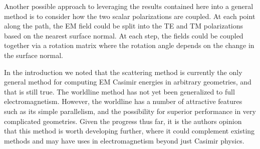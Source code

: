 Another possible approach to leveraging the results contained here into a general method is to consider 
how the two scalar polarizations are coupled.  
At each point along the path, the EM field could be split into the TE and TM polarizations based 
on the nearest surface normal.
At each step, the fields could be coupled together via a rotation matrix where the rotation
angle depends on the change in the surface normal.  

In the introduction we noted that the scattering method is currently the only general
method for computing EM Casimir energies in arbitrary geometries, and that is still true.  
The worldline method has not yet been generalized to full electromagnetism.   
However, the worldline has a number of attractive features such as its simple parallelism, and the possibility
for superior performance in very complicated geometries.  Given the progress thus far,  
it is the authors opinion that this method is worth developing further, where it could complement existing methods
and may have uses in electromagnetism beyond just Casimir physics.




